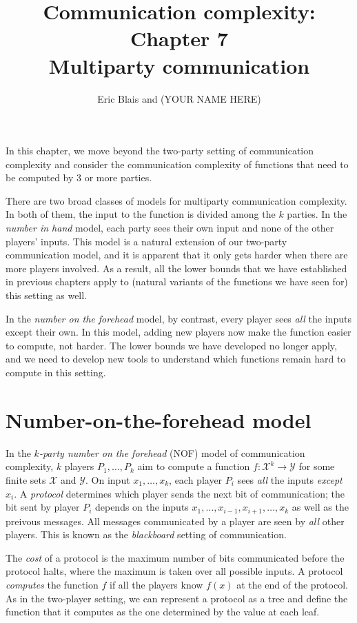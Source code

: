 \documentclass[11pt]{amsart}
\title{Communication complexity: Chapter 7 \\ Multiparty communication}
\author{Eric Blais and (YOUR NAME HERE)}
\theoremstyle{plain}
\theoremstyle{definition}
\theoremstyle{plain}
\newcommand{\calX}{\mathcal{X}}
\newcommand{\calY}{\mathcal{Y}}
\begin{document}
\maketitle

In this chapter, we move beyond the two-party setting of communication complexity and consider the communication complexity of functions that need to be computed by 3 or more parties.

There are two broad classes of models for multiparty communication complexity. In both of them, the input to the function is divided among the $k$ parties. In the \emph{number in hand} model, each party sees their own input and none of the other players' inputs. This model is a natural extension of our two-party communication model, and it is apparent that it only gets harder when there are more players involved. As a result, all the lower bounds that we have established in previous chapters apply to (natural variants of the functions we have seen for) this setting as well.

In the \emph{number on the forehead} model, by contrast, every player sees \emph{all} the inputs except their own. In this model, adding new players now make the function easier to compute, not harder. The lower bounds we have developed no longer apply, and we need to develop new tools to understand which functions remain hard to compute in this setting.


\newpage 
\section{Number-on-the-forehead model}

In the \emph{$k$-party number on the forehead} (NOF) model of communication complexity, $k$ players $P_1,\ldots,P_k$ aim to compute a function $f : \calX^k \to \calY$ for some finite sets $\calX$ and $\calY$. On input $x_1,\ldots,x_k$, each player $P_i$ sees \emph{all} the inputs \emph{except} $x_i$. A \emph{protocol} determines which player sends the next bit of communication; the bit sent by player $P_i$ depends on the inputs $x_1,\ldots,x_{i-1},x_{i+1},\ldots,x_k$ as well as the preivous messages. All messages communicated by a player are seen by \emph{all} other players. This is known as the \emph{blackboard} setting of communication.

The \emph{cost} of a protocol is the maximum number of bits communicated before the protocol halts, where the maximum is taken over all possible inputs. A protocol \emph{computes} the function $f$ if all the players know $f(x)$ at the end of the protocol. As in the two-player setting, we can represent a protocol as a tree and define the function that it computes as the one determined by the value at each leaf.
\end{document}
